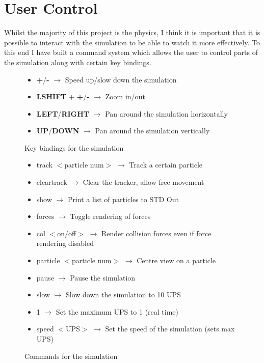 \section{User Control}
	
	Whilst the majority of this project is the physics, I think it is important that it is possible to interact with the simulation to be able to watch it more effectively. To this end I have built a command system which allows the user to control parts of the simulation along with certain key bindings.
	
	\begin{figure}[h]
		\begin{itemize}
			\item \textbf{+}/\textbf{-} $\rightarrow$ Speed up/slow down the simulation
			\item \textbf{LSHIFT} + \textbf{+}/\textbf{-} $\rightarrow$ Zoom in/out
			\item \textbf{LEFT}/\textbf{RIGHT} $\rightarrow$ Pan around the simulation horizontally
			\item \textbf{UP}/\textbf{DOWN} $\rightarrow$ Pan around the simulation vertically
		\end{itemize}
		\caption{Key bindings for the simulation}
		\label{fig:keybindings}
	\end{figure}
	
	\begin{figure}[h]
		\begin{itemize}
			\item track $<$particle num$>$ $\rightarrow$ Track a certain particle
			\item cleartrack $\rightarrow$ Clear the tracker, allow free movement
			\item show $\rightarrow$ Print a list of particles to STD Out
			\item forces $\rightarrow$ Toggle rendering of forces
			\item col $<$on/off$>$ $\rightarrow$ Render collision forces even if force rendering disabled
			\item particle $<$particle num$>$ $\rightarrow$ Centre view on a particle
			\item pause $\rightarrow$ Pause the simulation
			\item slow $\rightarrow$ Slow down the simulation to 10 UPS
			\item 1 $\rightarrow$ Set the maximum UPS to 1 (real time)
			\item speed $<$UPS$>$ $\rightarrow$ Set the speed of the simulation (sets max UPS)
			
			
		\end{itemize}
		\caption{Commands for the simulation}
		\label{fig:commands}
	\end{figure}
	
	